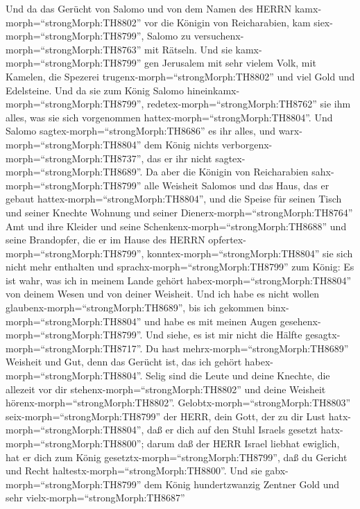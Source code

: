  Und da das Gerücht von Salomo und von dem Namen des HERRN
kamx-morph=``strongMorph:TH8802'' vor die Königin von Reicharabien, kam
siex-morph=``strongMorph:TH8799'', Salomo zu
versuchenx-morph=``strongMorph:TH8763'' mit Rätseln.  Und
sie kamx-morph=``strongMorph:TH8799'' gen Jerusalem mit sehr vielem
Volk, mit Kamelen, die Spezerei trugenx-morph=``strongMorph:TH8802'' und
viel Gold und Edelsteine. Und da sie zum König Salomo
hineinkamx-morph=``strongMorph:TH8799'',
redetex-morph=``strongMorph:TH8762'' sie ihm alles, was sie sich
vorgenommen hattex-morph=``strongMorph:TH8804''.  Und Salomo
sagtex-morph=``strongMorph:TH8686'' es ihr alles, und
warx-morph=``strongMorph:TH8804'' dem König nichts
verborgenx-morph=``strongMorph:TH8737'', das er ihr nicht
sagtex-morph=``strongMorph:TH8689''.  Da aber die Königin
von Reicharabien sahx-morph=``strongMorph:TH8799'' alle Weisheit Salomos
und das Haus, das er gebaut hattex-morph=``strongMorph:TH8804'',
 und die Speise für seinen Tisch und seiner Knechte Wohnung
und seiner Dienerx-morph=``strongMorph:TH8764'' Amt und ihre Kleider und
seine Schenkenx-morph=``strongMorph:TH8688'' und seine Brandopfer, die
er im Hause des HERRN opfertex-morph=``strongMorph:TH8799'',
konntex-morph=``strongMorph:TH8804'' sie sich nicht mehr enthalten
 und sprachx-morph=``strongMorph:TH8799'' zum König: Es ist
wahr, was ich in meinem Lande gehört habex-morph=``strongMorph:TH8804''
von deinem Wesen und von deiner Weisheit.  Und ich habe es
nicht wollen glaubenx-morph=``strongMorph:TH8689'', bis ich gekommen
binx-morph=``strongMorph:TH8804'' und habe es mit meinen Augen
gesehenx-morph=``strongMorph:TH8799''. Und siehe, es ist mir nicht die
Hälfte gesagtx-morph=``strongMorph:TH8717''. Du hast
mehrx-morph=``strongMorph:TH8689'' Weisheit und Gut, denn das Gerücht
ist, das ich gehört habex-morph=``strongMorph:TH8804''. 
Selig sind die Leute und deine Knechte, die allezeit vor dir
stehenx-morph=``strongMorph:TH8802'' und deine Weisheit
hörenx-morph=``strongMorph:TH8802''. 
Gelobtx-morph=``strongMorph:TH8803'' seix-morph=``strongMorph:TH8799''
der HERR, dein Gott, der zu dir Lust hatx-morph=``strongMorph:TH8804'',
daß er dich auf den Stuhl Israels gesetzt
hatx-morph=``strongMorph:TH8800''; darum daß der HERR Israel liebhat
ewiglich, hat er dich zum König gesetztx-morph=``strongMorph:TH8799'',
daß du Gericht und Recht haltestx-morph=``strongMorph:TH8800''.
 Und sie gabx-morph=``strongMorph:TH8799'' dem König
hundertzwanzig Zentner Gold und sehr vielx-morph=``strongMorph:TH8687''
